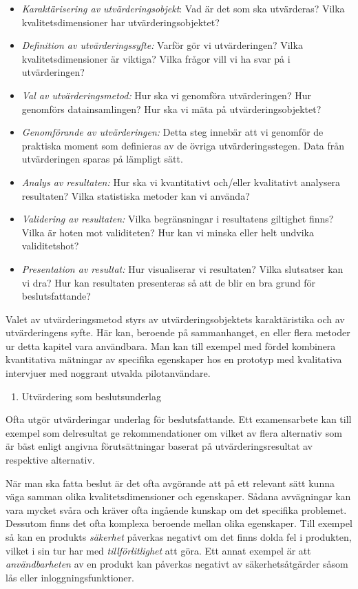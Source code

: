 \begin{itemize}
\item
  \emph{Karaktärisering av utvärderingsobjekt}: Vad är det som ska
  utvärderas? Vilka kvalitetsdimensioner har utvärderingsobjektet?
\item
  \emph{Definition av utvärderingssyfte:} Varför gör vi utvärderingen?
  Vilka kvalitetsdimensioner är viktiga? Vilka frågor vill vi ha svar på
  i utvärderingen?
\item
  \emph{Val av utvärderingsmetod:} Hur ska vi genomföra utvärderingen?
  Hur genomförs datainsamlingen? Hur ska vi mäta på
  utvärderingsobjektet?
\item
  \emph{Genomförande av utvärderingen:} Detta steg innebär att vi
  genomför de praktiska moment som definieras av de övriga
  utvärderingsstegen. Data från utvärderingen sparas på lämpligt sätt.
\item
  \emph{Analys av resultaten:} Hur ska vi kvantitativt och/eller
  kvalitativt analysera resultaten? Vilka statistiska metoder kan vi
  använda?
\item
  \emph{Validering av resultaten:} Vilka begränsningar i resultatens
  giltighet finns? Vilka är hoten mot validiteten? Hur kan vi minska
  eller helt undvika validitetshot?
\item
  \emph{Presentation av resultat:} Hur visualiserar vi resultaten? Vilka
  slutsatser kan vi dra? Hur kan resultaten presenteras så att de blir
  en bra grund för beslutsfattande?
\end{itemize}

Valet av utvärderingsmetod styrs av utvärderingsobjektets karaktäristika
och av utvärderingens syfte. Här kan, beroende på sammanhanget, en eller
flera metoder ur detta kapitel vara användbara. Man kan till exempel med
fördel kombinera kvantitativa mätningar av specifika egenskaper hos en
prototyp med kvalitativa intervjuer med noggrant utvalda pilotanvändare.

\begin{enumerate}
\def\labelenumi{\arabic{enumi}.}
\item
  Utvärdering som beslutsunderlag
\end{enumerate}

Ofta utgör utvärderingar underlag för beslutsfattande. Ett examensarbete
kan till exempel som delresultat ge rekommendationer om vilket av flera
alternativ som är bäst enligt angivna förutsättningar baserat på
utvärderingsresultat av respektive alternativ.

När man ska fatta beslut är det ofta avgörande att på ett relevant sätt
kunna väga samman olika kvalitetsdimensioner och egenskaper. Sådana
avvägningar kan vara mycket svåra och kräver ofta ingående kunskap om
det specifika problemet. Dessutom finns det ofta komplexa beroende
mellan olika egenskaper. Till exempel så kan en produkts \emph{säkerhet}
påverkas negativt om det finns dolda fel i produkten, vilket i sin tur
har med \emph{tillförlitlighet} att göra. Ett annat exempel är att
\emph{användbarheten} av en produkt kan påverkas negativt av
säkerhetsåtgärder såsom lås eller inloggningsfunktioner.

